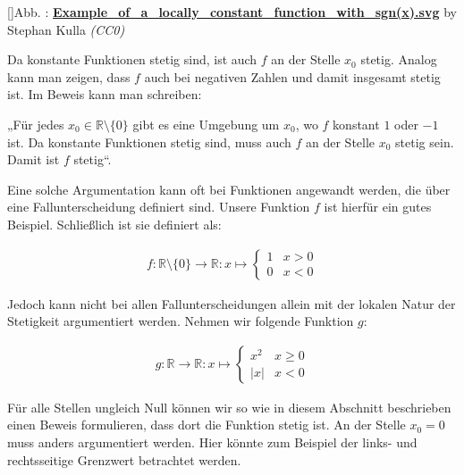\documentclass[fontsize=9pt,
               parskip=half-,
               DIV=14,
               listof=chapterentry,
               tocflat]{scrbook}
\newcounter{imagelabel}
\begin{document}
[]{Abb. : \protect\href{https://commons.wikimedia.org/wiki/File:Example_of_a_locally_constant_function_with_sgn(x).svg}{\textbf{Example\allowbreak\_of\allowbreak\_a\allowbreak\_locally\allowbreak\_constant\allowbreak\_function\allowbreak\_with\allowbreak\_sgn(x).svg}} by Stephan Kulla \textit{(CC0)}}\begin{center}
\end{center}

Da konstante Funktionen stetig sind, ist auch $f$ an der Stelle $x_{0}$ stetig. Analog kann man zeigen, dass $f$ auch bei negativen Zahlen und damit insgesamt stetig ist. Im Beweis kann man schreiben:

\begin{importantparagraph*}
„Für jedes $x_{0}\in \mathbb {R} \setminus \{0\}$ gibt es eine Umgebung um $x_{0}$, wo $f$ konstant $1$ oder $-1$ ist. Da konstante Funktionen stetig sind, muss auch $f$ an der Stelle $x_{0}$ stetig sein. Damit ist $f$ stetig“.

\end{importantparagraph*}

Eine solche Argumentation kann oft bei Funktionen angewandt werden, die über eine Fallunterscheidung definiert sind. Unsere Funktion $f$ ist hierfür ein gutes Beispiel. Schließlich ist sie definiert als:

\begin{align*}
f:\mathbb {R} \setminus \{0\}\to \mathbb {R} :x\mapsto {\begin{cases}1&x>0\\0&x<0\end{cases}}
\end{align*}

Jedoch kann nicht bei allen Fallunterscheidungen allein mit der lokalen Natur der Stetigkeit argumentiert werden. Nehmen wir folgende Funktion $g$:

\begin{align*}
g:\mathbb {R} \to \mathbb {R} :x\mapsto {\begin{cases}x^{2}&x\geq 0\\|x|&x<0\end{cases}}
\end{align*}

Für alle Stellen ungleich Null können wir so wie in diesem Abschnitt beschrieben einen Beweis formulieren, dass dort die Funktion stetig ist. An der Stelle $x_{0}=0$ muss anders argumentiert werden. Hier könnte zum Beispiel der links- und rechtsseitige Grenzwert betrachtet werden.
\end{document}
